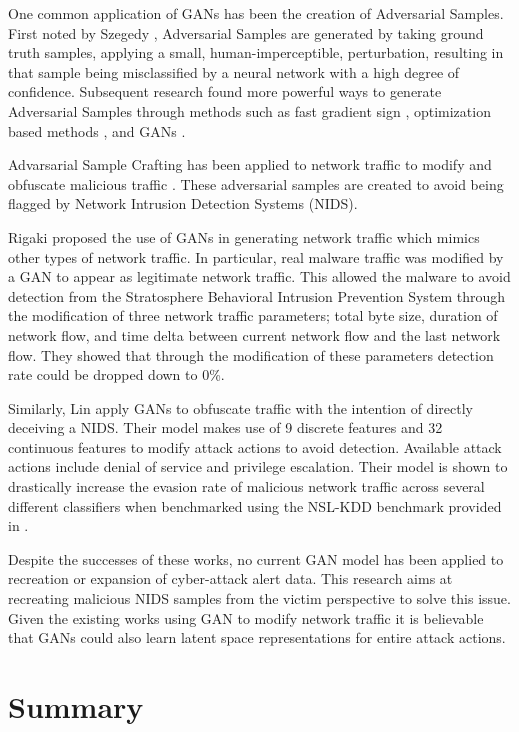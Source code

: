 \documentclass[12pt,american]{report}
\begin{document}
One common application of GANs has been the creation of Adversarial Samples. First noted by Szegedy \etal \cite{Szegedy2013}, Adversarial Samples are generated by taking ground truth samples, applying a small, human-imperceptible, perturbation, resulting in that sample being misclassified by a neural network with a high degree of confidence. Subsequent research found more powerful ways to generate Adversarial Samples through methods such as fast gradient sign \cite{Goodfellow2015}, optimization based methods \cite{Carlini2017, Liu2017, Eykholt2018}, and GANs \cite{Xiao2018}. 

Advarsarial Sample Crafting has been applied to network traffic to modify and obfuscate malicious traffic \cite{Rigaki2018, Lin2018, Hu2017, Anderson2017}. These adversarial samples are created to avoid being flagged by Network Intrusion Detection Systems (NIDS).

Rigaki \etal \cite{Rigaki2018} proposed the use of GANs in generating network traffic which mimics other types of network traffic. In particular, real malware traffic was modified by a GAN to appear as legitimate network traffic. This allowed the malware to avoid detection from the Stratosphere Behavioral Intrusion Prevention System through the modification of three network traffic parameters; total byte size, duration of network flow, and time delta between current network flow and the last network flow. They showed that through the modification of these parameters detection rate could be dropped down to 0\%. 

Similarly, Lin \etal \cite{Lin2018} apply GANs to obfuscate traffic with the intention of directly deceiving a NIDS. Their model makes use of 9 discrete features and 32 continuous features to modify attack actions to avoid detection. Available attack actions include denial of service and privilege escalation. Their model is shown to drastically increase the evasion rate of malicious network traffic across several different classifiers when benchmarked using the NSL-KDD benchmark provided in \cite{Hu2015}.

Despite the successes of these works, no current GAN model has been applied to recreation or expansion of cyber-attack alert data. This research aims at recreating malicious NIDS samples from the victim perspective to solve this issue. Given the existing works using GAN to modify network traffic it is believable that GANs could also learn latent space representations for entire attack actions. 

\section{Summary}
\end{document}
